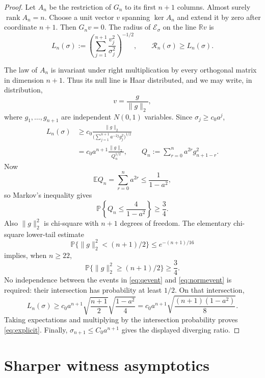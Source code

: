 \documentclass[11pt]{article}
\newcommand{\R}{\mathbb R}
\newcommand{\E}{\mathbb E}
\newcommand{\Pp}{\mathbb P}
\newcommand{\cE}{\mathcal E}
\newcommand{\cR}{\mathcal R}
\DeclareMathOperator{\rank}{rank}
\begin{document}
\begin{proof}
Let $A_n$ be the restriction of $G_n$ to its first $n+1$ columns.  Almost
surely $\rank A_n=n$.  Choose a unit vector $v$ spanning $\ker A_n$ and extend
it by zero after coordinate $n+1$.  Then $G_nv=0$.  The radius of
$\cE_\sigma$ on the line $\R v$ is
\[
 L_n(\sigma)
   :=\left(\sum_{j=1}^{n+1}\frac{v_j^2}{\sigma_j^2}\right)^{-1/2},
 \qquad \cR_n(\sigma)\ge L_n(\sigma).
\]

The law of $A_n$ is invariant under right multiplication by every orthogonal
matrix in dimension $n+1$.  Thus its null line is Haar distributed, and we may
write, in distribution,
\[
                 v=\frac{g}{\|g\|_2},
\]
where $g_1,\dots,g_{n+1}$ are independent $N(0,1)$ variables.  Since
$\sigma_j\ge c_0a^j$,
\begin{align*}
 L_n(\sigma)
 &\ge c_0\frac{\|g\|_2}
          {\bigl(\sum_{j=1}^{n+1}a^{-2j}g_j^2\bigr)^{1/2}} \\
 &=c_0a^{n+1}\frac{\|g\|_2}{Q_n^{1/2}},
 \qquad
 Q_n:=\sum_{r=0}^{n}a^{2r}g_{n+1-r}^2.
\end{align*}
Now
\[
          \E Q_n=\sum_{r=0}^{n}a^{2r}\le\frac1{1-a^2},
\]
so Markov's inequality gives
\begin{equation}\label{eq:qevent}
 \Pp\left\{Q_n\le\frac4{1-a^2}\right\}\ge\frac34.
\end{equation}
Also $\|g\|_2^2$ is chi-square with $n+1$ degrees of freedom.  The elementary
chi-square lower-tail estimate
\[
 \Pp\{\|g\|_2^2<(n+1)/2\}\le e^{-(n+1)/16}
\]
implies, when $n\ge22$,
\begin{equation}\label{eq:normevent}
 \Pp\{\|g\|_2^2\ge(n+1)/2\}\ge\frac34.
\end{equation}
No independence between the events in \eqref{eq:qevent} and
\eqref{eq:normevent} is required: their intersection has probability at least
$1/2$.  On that intersection,
\[
 L_n(\sigma)
 \ge c_0a^{n+1}
      \sqrt{\frac{n+1}{2}}\sqrt{\frac{1-a^2}{4}}
 =c_0a^{n+1}\sqrt{\frac{(n+1)(1-a^2)}8}.
\]
Taking expectations and multiplying by the intersection probability proves
\eqref{eq:explicit}.  Finally,
$\sigma_{n+1}\le C_0a^{n+1}$ gives the displayed diverging ratio.
\end{proof}

\section{Sharper witness asymptotics}
\end{document}

